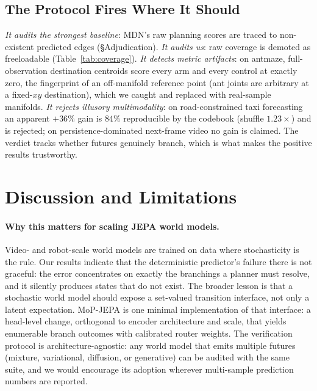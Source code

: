 \documentclass[letterpaper]{article}
\begin{document}
\subsection{The Protocol Fires Where It Should}

\emph{It audits the strongest baseline}: MDN's raw planning scores are traced to non-existent predicted
edges (\S Adjudication). \emph{It audits us}: raw coverage is demoted as freeloadable
(Table~\ref{tab:coverage}). \emph{It detects metric artifacts}: on antmaze, full-observation destination
centroids score every arm and every control at exactly zero, the fingerprint of an off-manifold reference
point (ant joints are arbitrary at a fixed-$xy$ destination), which we caught and replaced with
real-sample manifolds. \emph{It rejects illusory multimodality}: on road-constrained taxi forecasting an
apparent $+36\%$ gain is $84\%$ reproducible by the codebook (shuffle $1.23\times$) and is rejected; on
persistence-dominated next-frame video no gain is claimed. The verdict tracks whether futures genuinely
branch, which is what makes the positive results trustworthy.

\section{Discussion and Limitations}

\paragraph{Why this matters for scaling JEPA world models.}
Video- and robot-scale world models \citep{assran2025vjepa2,zhou2024dinowm} are trained on data where
stochasticity is the rule. Our results indicate that the deterministic predictor's failure there is not
graceful: the error concentrates on exactly the branchings a planner must resolve, and it silently
produces states that do not exist. The broader lesson is that a stochastic world model should expose a
set-valued transition interface, not only a latent expectation. MoP-JEPA is one minimal implementation of
that interface: a head-level change, orthogonal to encoder architecture and scale, that yields enumerable
branch outcomes with calibrated router weights. The verification protocol is architecture-agnostic: any
world model that emits multiple futures (mixture, variational, diffusion, or generative) can be audited
with the same suite, and we would encourage its adoption wherever multi-sample prediction numbers are reported.
\end{document}
